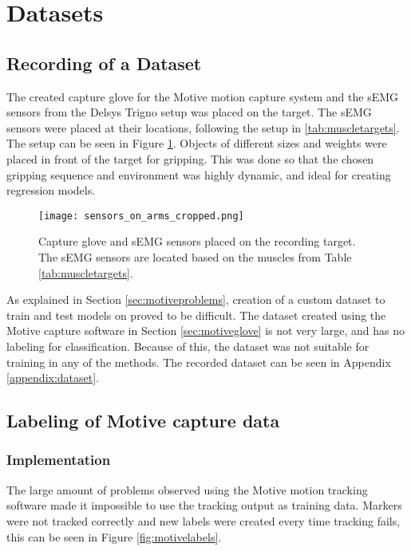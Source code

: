 \documentclass[../main.tex]{subfiles}
\begin{document}
\section{Datasets}

\subsection{Recording of a Dataset}

The created capture glove for the Motive motion capture system and the sEMG sensors from the Delsys Trigno setup was placed on the target.
The sEMG sensors were placed at their locations, following the setup in \ref{tab:muscletargets}.
The setup can be seen in Figure \ref{fig:musclesensorsonarm}.
Objects of different sizes and weights were placed in front of the target for gripping. 
This was done so that the chosen gripping sequence and environment was highly dynamic, and ideal for creating regression models.

\begin{figure}[H]
\begin{center}
\texttt{[image: sensors\_on\_arms\_cropped.png]}
\caption{Capture glove and sEMG sensors placed on the recording target. The sEMG sensors are located based on the muscles from Table \ref{tab:muscletargets}.}
\label{fig:musclesensorsonarm}
\end{center}
\end{figure}

As explained in Section \ref{sec:motiveproblems}, creation of a custom dataset to train and test models on proved to be difficult.
The dataset created using the Motive capture software in Section \ref{sec:motiveglove} is not very large, and has no labeling for classification.
Because of this, the dataset was not suitable for training in any of the methods.
The recorded dataset can be seen in Appendix \ref{appendix:dataset}. 

\subsection{Labeling of Motive capture data}

\subsubsection{Implementation}
\label{sec:motivecleaning}

The large amount of problems observed using the Motive motion tracking software made it impossible to use the tracking output as training data.
Markers were not tracked correctly and new labels were created every time tracking fails, this can be seen in Figure \ref{fig:motivelabels}.
\end{document}
